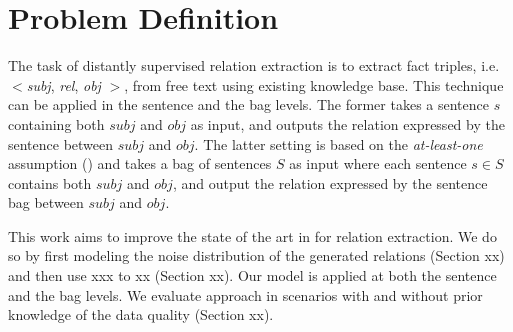 \section{Problem Definition}
The task of distantly supervised relation extraction is to extract fact triples, i.e. $<$\emph{subj},  \emph{rel},
\emph{obj} $>$, from free text using existing knowledge base. This technique can be applied in the sentence and the bag
levels.  The former  takes a sentence $s$ containing both $subj$ and $obj$ as input, and outputs the relation expressed
by the sentence between $subj$ and $obj$. The latter setting is based on the \textit{at-least-one} assumption
() and takes a bag of sentences $S$ as input where each sentence
$s\in S$ contains both $subj$ and
$obj$, and output  the relation expressed by the sentence bag between $subj$ and $obj$.


This work aims to improve the state of the art in \DS for relation extraction. 
We do so by first modeling the noise distribution of the \DS generated relations (Section xx) and then use xxx to xx (Section xx).
Our model is applied at both the sentence and the bag levels. We evaluate approach
in scenarios with and without prior knowledge of the data quality (Section xx). 





%
